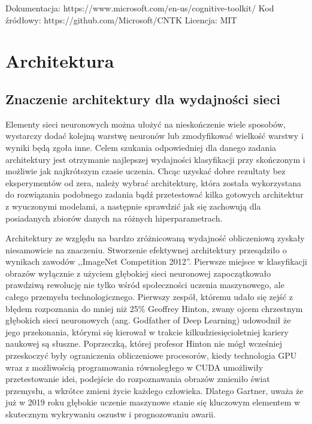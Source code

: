 \documentclass[12pt,a4paper,twoside,titlepage,openright]{book}
\begin{document}
\noindent
\newline
Dokumentacja: https://www.microsoft.com/en-us/cognitive-toolkit/
\newline
Kod źródłowy: https://github.com/Microsoft/CNTK
\newline
Licencja: MIT



\chapter{Architektura}
\section{Znaczenie architektury dla wydajności sieci}
Elementy sieci neuronowych można ułożyć na nieskończenie wiele sposobów, wystarczy dodać kolejną warstwę neuronów lub zmodyfikować wielkość warstwy i wyniki będą zgoła inne. Celem szukania odpowiedniej dla danego zadania architektury jest otrzymanie najlepszej wydajności klasyfikacji przy skończonym i możliwie jak najkrótszym czasie uczenia. Chcąc uzyskać dobre rezultaty bez eksperymentów od zera, należy wybrać architekturę, która została wykorzystana do rozwiązania podobnego zadania bądź przetestować kilka gotowych architektur z wyuczonymi modelami, a następnie sprawdzić jak się zachowują dla posiadanych zbiorów danych na różnych hiperparametrach.

Architektury ze względu na bardzo zróżnicowaną wydajność obliczeniową zyskały niesamowicie na znaczeniu. Stworzenie efektywnej architektury przesądziło o wynikach zawodów ,,ImageNet Competition 2012''. Pierwsze miejsce w klasyfikacji obrazów wyłącznie z użyciem głębokiej sieci neuronowej zapoczątkowało prawdziwą rewolucję nie tylko wśród społeczności uczenia maszynowego, ale całego przemysłu technologicznego. Pierwszy zespół, któremu udało się zejść z błędem rozpoznania do mniej niż 25\% Geoffrey Hinton, zwany ojcem chrzestnym głębokich sieci neuronowych (ang. Godfather of Deep Learning) udowodnił że jego przekonania, którymi się kierował w trakcie kilkudziesięcioletniej kariery naukowej są słuszne. Poprzeczką, której profesor Hinton nie mógł wcześniej przeskoczyć były ograniczenia obliczeniowe procesorów, kiedy technologia GPU wraz z możliwością programowania równoległego w CUDA umożliwiły przetestowanie idei, podejście do rozpoznawania obrazów zmieniło świat przemysłu, a wkrótce zmieni życie każdego człowieka. Dlatego Gartner, uważa że już w 2019 roku głębokie uczenie maszynowe stanie się kluczowym elementem w skutecznym wykrywaniu oszustw i prognozowaniu awarii.\cite{siteGartner2019}
\end{document}
